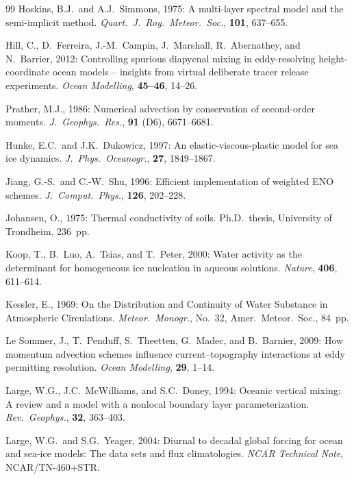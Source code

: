 \documentclass[11pt,twoside]{report}
\begin{document}
\begin{thebibliography}{99}
Hoskins, B.J.\ and A.J.~Simmons, 1975:
A multi-layer spectral model and the semi-implicit method.
\textit{Quart.\ J.\ Roy.\ Meteor.\ Soc.}, \textbf{101}, 637--655.

Hill, C., D.~Ferreira, J.-M.~Campin, J.~Marshall, R.~Abernathey, and
N.~Barrier, 2012:
Controlling spurious diapycnal mixing in eddy-resolving height-coordinate
ocean models -- insights from virtual deliberate tracer release experiments.
\textit{Ocean Modelling}, \textbf{45--46}, 14--26.

Prather, M.J., 1986:
Numerical advection by conservation of second-order moments.
\textit{J.\ Geophys.\ Res.}, \textbf{91} (D6), 6671--6681.

Hunke, E.C.\ and J.K.~Dukowicz, 1997:
An elastic-viscous-plastic model for sea ice dynamics.
\textit{J.\ Phys.\ Oceanogr.}, \textbf{27}, 1849--1867.

Jiang, G.-S.\ and C.-W.~Shu, 1996:
Efficient implementation of weighted ENO schemes.
\textit{J.\ Comput.\ Phys.}, \textbf{126}, 202--228.

Johansen, O., 1975:
Thermal conductivity of soils.
Ph.D.\ thesis, University of Trondheim, 236~pp.

Koop, T., B.~Luo, A.~Tsias, and T.~Peter, 2000:
Water activity as the determinant for homogeneous ice nucleation in aqueous
solutions.
\textit{Nature}, \textbf{406}, 611--614.

Kessler, E., 1969:
On the Distribution and Continuity of Water Substance in Atmospheric
Circulations.
\textit{Meteor.\ Monogr.}, No.~32, Amer.\ Meteor.\ Soc., 84~pp.

Le Sommer, J., T.~Penduff, S.~Theetten, G.~Madec, and B.~Barnier, 2009:
How momentum advection schemes influence current--topography interactions at
eddy permitting resolution.
\textit{Ocean Modelling}, \textbf{29}, 1--14.

Large, W.G., J.C.~McWilliams, and S.C.~Doney, 1994:
Oceanic vertical mixing: A review and a model with a nonlocal boundary
layer parameterization.
\textit{Rev.\ Geophys.}, \textbf{32}, 363--403.

Large, W.G.\ and S.G.~Yeager, 2004:
Diurnal to decadal global forcing for ocean and sea-ice models: The data
sets and flux climatologies.
\textit{NCAR Technical Note}, NCAR/TN-460+STR.


\end{thebibliography}
\end{document}
